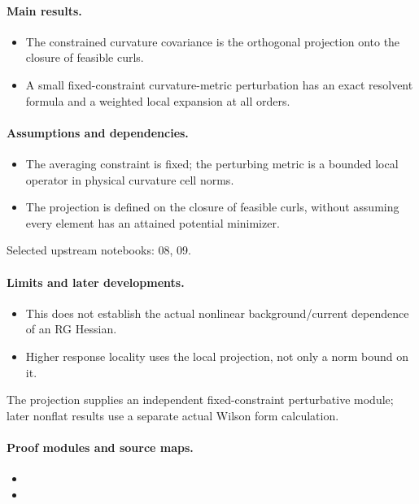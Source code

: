 \documentclass[11pt]{article}
\theoremstyle{remark}
\begin{document}
\paragraph{Main results.}
\begin{itemize}
\item The constrained curvature covariance is the orthogonal projection onto the closure of feasible curls.
\item A small fixed-constraint curvature-metric perturbation has an exact resolvent formula and a weighted local expansion at all orders.
\end{itemize}

\paragraph{Assumptions and dependencies.}
\begin{itemize}
\item The averaging constraint is fixed; the perturbing metric is a bounded local operator in physical curvature cell norms.
\item The projection is defined on the closure of feasible curls, without assuming every element has an attained potential minimizer.
\end{itemize}

Selected upstream notebooks: 08, 09.\par

\paragraph{Limits and later developments.}
\begin{itemize}
\item This does not establish the actual nonlinear background/current dependence of an RG Hessian.
\item Higher response locality uses the local projection, not only a norm bound on it.
\end{itemize}

The projection supplies an independent fixed-constraint perturbative module; later nonflat results use a separate actual Wilson form calculation.

\paragraph{Proof modules and source maps.}
\begingroup\small
\begin{itemize}
\item {}
\item {}
\end{itemize}
\endgroup
\end{document}
